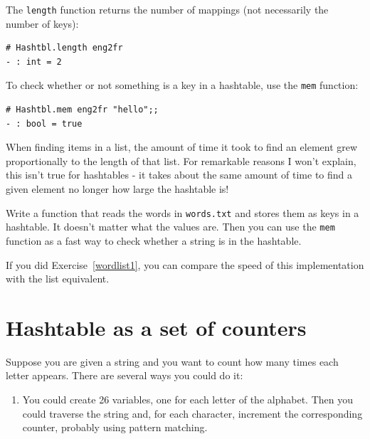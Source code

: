 \documentclass[10pt]{book}
\begin{document}
{The {\tt length} function returns the number of mappings (not necessarily
the number of keys):

\beforeverb
\begin{verbatim}
# Hashtbl.length eng2fr
- : int = 2
\end{verbatim}
\afterverb

To check whether or not something is a key in a hashtable, use the {\tt mem}
function:

\beforeverb
\begin{verbatim}
# Hashtbl.mem eng2fr "hello";;
- : bool = true
\end{verbatim}
\afterverb


When finding items in a list, the amount of time it took to find an element
grew proportionally to the length of that list. For remarkable reasons I won't
explain, this isn't true for hashtables - it takes about the same amount of time
to find a given element no longer how large the hashtable is!


\begin{ex}
\label{wordlist2}


Write a function that reads the words in {\tt words.txt} and
stores them as keys in a hashtable.  It doesn't matter what the
values are.  Then you can use the {\tt mem} function
as a fast way to check whether a string is in
the hashtable.

If you did Exercise~\ref{wordlist1}, you can compare the speed
of this implementation with the list equivalent.

\end{ex}


\section{Hashtable as a set of counters}
\label{histogram}


Suppose you are given a string and you want to count how many
times each letter appears.  There are several ways you could do it:

\begin{enumerate}

\item You could create 26 variables, one for each letter of the
alphabet.  Then you could traverse the string and, for each
character, increment the corresponding counter, probably using
pattern matching.


\end{enumerate}}
\end{document}
